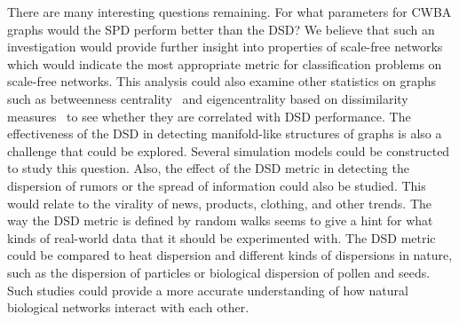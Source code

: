 There are many interesting questions remaining. For what parameters for CWBA graphs would the SPD perform better than the DSD? We believe that such 
an investigation would provide further insight into properties of scale-free networks which would indicate the most appropriate metric for classification
problems on scale-free networks. This analysis could also examine other 
statistics on graphs such as betweenness centrality~\cite{newman2005measure} and eigencentrality based on dissimilarity measures~\cite{alvarez2015eigencentrality}
to see whether they are correlated with DSD performance. The effectiveness of the DSD in detecting manifold-like structures of
graphs is also a challenge that could be explored. Several simulation models could be
constructed to study this question. Also, the effect of the DSD metric in
detecting the dispersion of rumors or the spread of information could also
be studied. This would relate to the virality of news, products, clothing, and other trends. The way the DSD metric is defined by random walks seems to give
a hint for what kinds of real-world data that it should be experimented with.
The DSD metric could be compared to heat dispersion and different kinds
of dispersions in nature, such as the dispersion of particles or biological
dispersion of pollen and seeds. Such studies could provide a more accurate
understanding of how natural biological networks interact with each other.